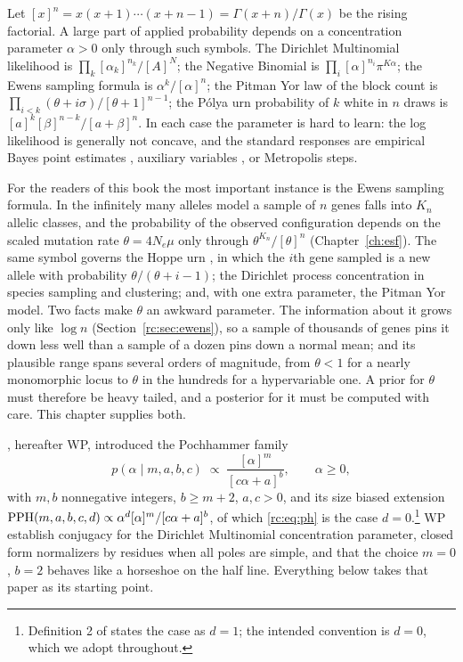 Let $[x]^n=x(x+1)\cdots(x+n-1)=\Gamma(x+n)/\Gamma(x)$ be the rising factorial. A large part of applied probability depends on a concentration parameter $\alpha>0$ only through such symbols. The Dirichlet Multinomial likelihood is $\prod_k[\alpha_k]^{n_k}/[A]^N$; the Negative Binomial is $\prod_i[\alpha]^{n_i}\pi^{K\alpha}$; the Ewens sampling formula \citep{rc:ewens1972} is $\alpha^k/[\alpha]^n$; the Pitman Yor law of the block count is $\prod_{i<k}(\theta+i\sigma)/[\theta+1]^{n-1}$; the P\'olya urn probability of $k$ white in $n$ draws is $[a]^k[\beta]^{n-k}/[a+\beta]^n$. In each case the parameter is hard to learn: the log likelihood is generally not concave, and the standard responses are empirical Bayes point estimates \citep{rc:minka2000}, auxiliary variables \citep{rc:escobar1995}, or Metropolis steps.

For the readers of this book the most important instance is the Ewens sampling formula. In the infinitely many alleles model a sample of $n$ genes falls into $K_n$ allelic classes, and the probability of the observed configuration depends on the scaled mutation rate $\theta=4N_e\mu$ only through $\theta^{K_n}/[\theta]^n$ (Chapter~\ref{ch:esf}). The same symbol governs the Hoppe urn \citep{rc:hoppe1984}, in which the $i$th gene sampled is a new allele with probability $\theta/(\theta+i-1)$; the Dirichlet process concentration in species sampling and clustering; and, with one extra parameter, the Pitman Yor model. Two facts make $\theta$ an awkward parameter. The information about it grows only like $\log n$ (Section~\ref{rc:sec:ewens}), so a sample of thousands of genes pins it down less well than a sample of a dozen pins down a normal mean; and its plausible range spans several orders of magnitude, from $\theta<1$ for a nearly monomorphic locus to $\theta$ in the hundreds for a hypervariable one. A prior for $\theta$ must therefore be heavy tailed, and a posterior for it must be computed with care. This chapter supplies both.

\citet{rc:wang2024}, hereafter WP, introduced the Pochhammer family
\begin{equation}\label{rc:eq:ph}
p(\alpha\mid m,a,b,c)\;\propto\;\frac{[\alpha]^m}{[c\alpha+a]^b},\qquad \alpha\ge0,
\end{equation}
with $m,b$ nonnegative integers, $b\ge m+2$, $a,c>0$, and its size biased extension $\mathrm{PPH}(m,a,b,c,d)\propto\alpha^d[\alpha]^m/[c\alpha+a]^b$, of which \eqref{rc:eq:ph} is the case $d=0$.\footnote{Definition 2 of \citet{rc:wang2024} states the case as $d=1$; the intended convention is $d=0$, which we adopt throughout.} WP establish conjugacy for the Dirichlet Multinomial concentration parameter, closed form normalizers by residues when all poles are simple, and that the choice $m=0$, $b=2$ behaves like a horseshoe on the half line. Everything below takes that paper as its starting point.

